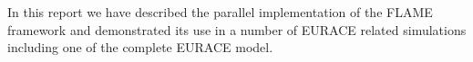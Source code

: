 In this report we have described the parallel implementation of the FLAME framework and
demonstrated its use in a number of EURACE related simulations including one of the complete
EURACE model.